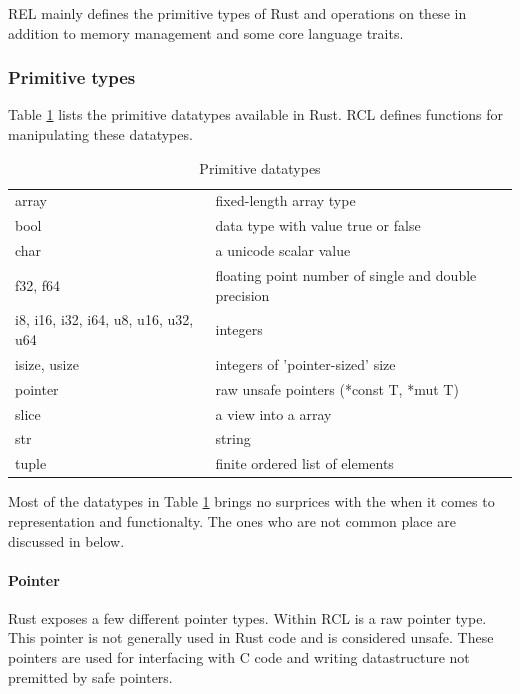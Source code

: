 REL mainly defines the primitive types of Rust and operations on these in addition to memory management and some core language traits.

\subsubsection{Primitive types}

Table \ref{tab:rust:datatypes} lists the primitive datatypes available in Rust.
RCL defines functions for manipulating these datatypes.

\begin{table}[H]
  \begin{tabular}{l|l}
    array & fixed-length array type \\
    bool & data type with value true or false \\
    char & a unicode scalar value \\
    f32, f64 & floating point number of single and double precision \\
    i8, i16, i32, i64, u8, u16, u32, u64 & integers \\
    isize, usize & integers of 'pointer-sized' size \\
    pointer & raw unsafe pointers (*const T, *mut T) \\
    slice & a view into a array \\
    str & string \\
    tuple & finite ordered list of elements
  \end{tabular}

  \caption{Primitive datatypes}
  \label{tab:rust:datatypes}
\end{table}

Most of the datatypes in Table \ref{tab:rust:datatypes} brings no surprices with the when it comes to representation and functionalty.
The ones who are not common place are discussed in below.

\paragraph{Pointer}

Rust exposes a few different pointer types.
Within RCL is a raw pointer type.
This pointer is not generally used in Rust code and is considered unsafe.
These pointers are used for interfacing with C code and writing datastructure not premitted by safe pointers. 

